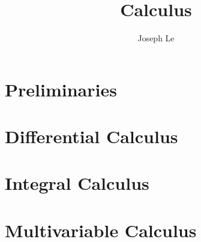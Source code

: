 \documentclass[10pt]{book}
\begin{document}
\title{Calculus}
\author{Joseph Le}
\date{}
\maketitle
\tableofcontents

\part{Preliminaries}


\part{Differential Calculus}

\part{Integral Calculus}

\part{Multivariable Calculus}


\printbibliography
\printindex
\end{document}
